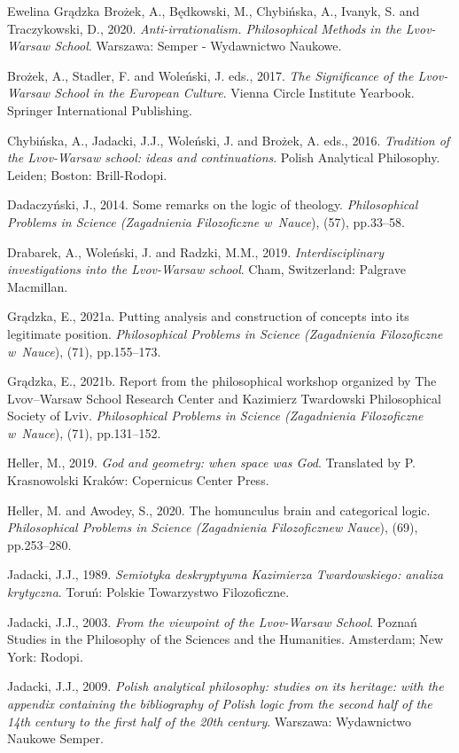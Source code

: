 \begin{newrevengenv}{Ewelina Grądzka}
Brożek, A., Będkowski, M., Chybińska, A., Ivanyk, S. and Traczykowski, D., 2020. \textit{Anti-irrationalism. Philosophical Methods in the Lvov-Warsaw School}. Warszawa: Semper - Wydawnictwo Naukowe.

Brożek, A., Stadler, F. and Woleński, J. eds., 2017. \textit{The Significance of the Lvov-Warsaw School in the European Culture}. Vienna Circle Institute Yearbook. Springer International Publishing.

Chybińska, A., Jadacki, J.J., Woleński, J. and Brożek, A. eds., 2016. \textit{Tradition of the Lvov-Warsaw school: ideas and continuations}. Polish Analytical Philosophy. Leiden; Boston: Brill-Rodopi.

Dadaczyński, J., 2014. Some remarks on the logic of theology. \textit{Philosophical Problems in Science (Zagadnienia Filozoficzne w~Nauce}), (57), pp.33–58.

Drabarek, A., Woleński, J. and Radzki, M.M., 2019. \textit{Interdisciplinary investigations into the Lvov-Warsaw school}. Cham, Switzerland: Palgrave Macmillan.

Grądzka, E., 2021a. Putting analysis and construction of concepts into its legitimate position. \textit{Philosophical Problems in Science (Zagadnienia Filozoficzne w~Nauce}), (71), pp.155–173.

Grądzka, E., 2021b. Report from the philosophical workshop organized by The Lvov–Warsaw School Research Center and Kazimierz Twardowski Philosophical Society of Lviv. \textit{Philosophical Problems in Science (Zagadnienia Filozoficzne w~Nauce}), (71), pp.131–152.

Heller, M., 2019. \textit{God and geometry: when space was God}. Translated by P. Krasnowolski Kraków: Copernicus Center Press.

Heller, M. and Awodey, S., 2020. The homunculus brain and categorical logic. \textit{Philosophical Problems in Science (Zagadnienia Filozoficznew Nauce}), (69), pp.253–280.

Jadacki, J.J., 1989. \textit{Semiotyka deskryptywna Kazimierza Twardowskiego: analiza krytyczna}. Toruń: Polskie Towarzystwo Filozoficzne.

Jadacki, J.J., 2003. \textit{From the viewpoint of the Lvov-Warsaw School}. Poznań Studies in the Philosophy of the Sciences and the Humanities. Amsterdam; New York: Rodopi.

Jadacki, J.J., 2009. \textit{Polish analytical philosophy: studies on its heritage: with the appendix containing the bibliography of Polish logic from the second half of the 14th century to the first half of the 20th century}. Warszawa: Wydawnictwo Naukowe Semper.


\end{newrevengenv}
